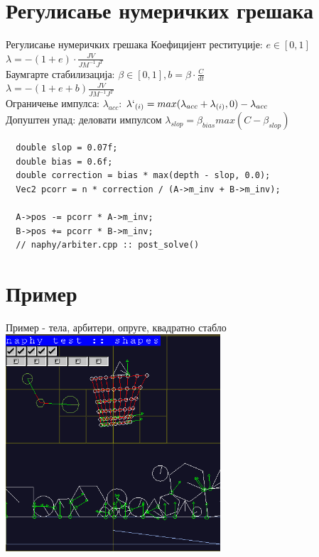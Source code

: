 \documentclass[]{beamer}
\begin{document}
\section{Регулисање нумеричких грешака}
\begin{frame}[fragile]{Регулисање нумеричких грешака}
    Коефицијент реституције: $e \in [0, 1]$ \\
    $\lambda = -(1 + e) \cdot \frac{JV}{J M^{-1} J^T}$ \\
    Баумгарте стабилизација: $\beta \in [0, 1], b = \beta \cdot \frac{C}{dt}$ \\
    $\lambda = -(1 + e + b) \frac{JV}{J M^{-1} J^T}$ \\
    Ограничење импулса: $\lambda _{acc}$: $\lambda`_{(i)} = max(\lambda _{acc} + \lambda _{(i)}, 0) - \lambda_{acc}$ \\
    Допуштен упад: деловати импулсом $\lambda_{slop} = \beta_{bias} max(C - \beta_{slop})$
    
    \begin{verbatim}
  double slop = 0.07f;
  double bias = 0.6f;
  double correction = bias * max(depth - slop, 0.0);
  Vec2 pcorr = n * correction / (A->m_inv + B->m_inv);
  	
  A->pos -= pcorr * A->m_inv;
  B->pos += pcorr * B->m_inv;
  // naphy/arbiter.cpp :: post_solve()
    \end{verbatim}
\end{frame}


\section{Пример}
\begin{frame}{Пример - тела, арбитери, опруге, квадратно стабло}
    \includegraphics[width=8cm]{ss_01.png}
\end{frame}
\end{document}
